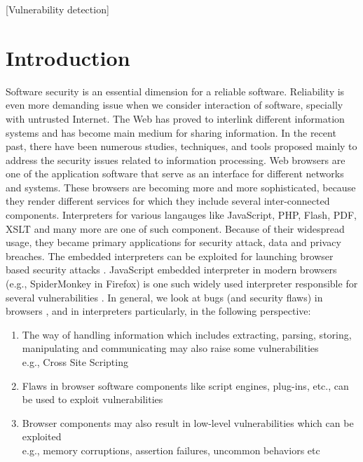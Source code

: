 \documentclass{acm_proc_article-sp}
\begin{document}
[Vulnerability detection]

\section{Introduction}

Software security is an essential dimension for a reliable software. Reliability is even more demanding issue when we consider interaction of software, specially with untrusted Internet. The Web has proved to interlink different information systems and has become main medium for sharing information. In the recent past, there have been numerous studies, techniques, and tools proposed mainly to address the security issues related to information processing. Web browsers are one of the application software that serve as an interface for different networks and systems. These browsers are becoming more and more sophisticated, because they render different services for which they include several inter-connected components. Interpreters for various langauges like JavaScript, PHP, Flash, PDF, XSLT and many more are one of such component. Because of their widespread usage, they became primary applications for security attack, data and privacy breaches. The embedded interpreters can be exploited for launching browser based security attacks \cite{AnupamM98}. JavaScript embedded interpreter in modern browsers (e.g., SpiderMonkey in Firefox) is one such widely used interpreter responsible for several vulnerabilities \cite{Hallaraker:2005}. In general, we look at bugs (and security flaws) in browsers \cite{Sekar09}, and in interpreters particularly, in the following perspective:
\begin{enumerate}
\item The way of handling information which includes extracting, parsing, storing, manipulating and communicating may also raise some vulnerabilities
\\e.g., Cross Site Scripting 
\item Flaws in browser software components like script engines, plug-ins, etc., can be used to exploit vulnerabilities
\item Browser components may also result in low-level vulnerabilities which can be exploited
\\e.g., memory corruptions, assertion failures, uncommon behaviors etc
\end{enumerate}
\end{document}
